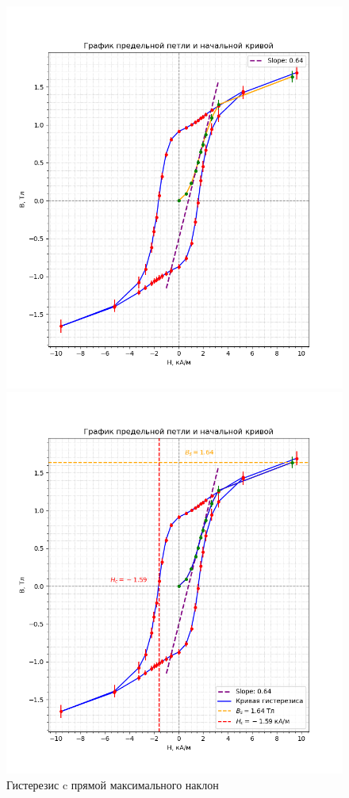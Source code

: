 \documentclass[a4paper, 12pt]{article}
\begin{document}
\begin{figure}[H]
    \centering
    \begin{minipage}[b]{0.45\linewidth}
        \centering
        \includegraphics[width=1.2\linewidth]{fig3_with_slope.png}
        \caption{Гистерезис c прямой максимального наклон}
        \label{fig:graph1}
    \end{minipage}
    \hfill
    \begin{minipage}[b]{0.45\linewidth}
        \centering
        \includegraphics[width=1.2\linewidth]{fig4_with_bars.png}

\end{minipage}
\end{figure}
\end{document}
